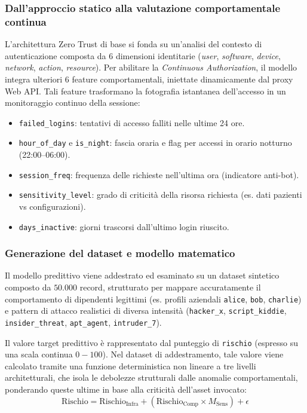 \subsubsection{Dall'approccio statico alla valutazione comportamentale continua}
L'architettura Zero Trust di base si fonda su un'analisi del contesto di autenticazione composta da 6 dimensioni identitarie (\textit{user}, \textit{software}, \textit{device}, \textit{network}, \textit{action}, \textit{resource}). Per abilitare la \textit{Continuous Authorization}, il modello integra ulteriori 6 feature comportamentali, iniettate dinamicamente dal proxy Web API. Tali feature trasformano la fotografia istantanea dell'accesso in un monitoraggio continuo della sessione:
\begin{itemize}
    \item \texttt{failed\_logins}: tentativi di accesso falliti nelle ultime 24 ore.
    \item \texttt{hour\_of\_day} e \texttt{is\_night}: fascia oraria e flag per accessi in orario notturno (22:00--06:00).
    \item \texttt{session\_freq}: frequenza delle richieste nell'ultima ora (indicatore anti-bot).
    \item \texttt{sensitivity\_level}: grado di criticità della risorsa richiesta (es. dati pazienti vs configurazioni).
    \item \texttt{days\_inactive}: giorni trascorsi dall'ultimo login riuscito.
\end{itemize}

\subsubsection{Generazione del dataset e modello matematico}
Il modello predittivo viene addestrato ed esaminato su un dataset sintetico composto da $50.000$ record, strutturato per mappare accuratamente il comportamento di dipendenti legittimi (es. profili aziendali \texttt{alice}, \texttt{bob}, \texttt{charlie}) e pattern di attacco realistici di diversa intensità (\texttt{hacker\_x}, \texttt{script\_kiddie}, \texttt{insider\_threat}, \texttt{apt\_agent}, \texttt{intruder\_7}). 

Il valore target predittivo è rappresentato dal punteggio di \texttt{rischio} (espresso su una scala continua $0-100$). Nel dataset di addestramento, tale valore viene calcolato tramite una funzione deterministica non lineare a tre livelli architetturali, che isola le debolezze strutturali dalle anomalie comportamentali, ponderando queste ultime in base alla criticità dell'asset invocato:
\begin{equation}
    \text{Rischio} = \text{Rischio}_{\text{Infra}} + \left( \text{Rischio}_{\text{Comp}} \times M_{\text{Sens}} \right) + \epsilon
\end{equation}

